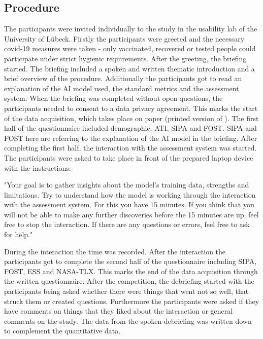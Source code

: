 \documentclass[11pt,a4paper,english]{scrreprt}
\begin{document}
\subsection{Procedure}\label{subsection:procedure}
The participants were invited individually to the study in the usability lab of the University of Lübeck. Firstly the participants were greeted and the necessary covid-19 measures were taken - only vaccinated, recovered or tested people could participate under strict hygienic requirements. After the greeting, the briefing started. The briefing included a spoken and written thematic introduction and a brief overview of the procedure. Additionally the participants got to read an explanation of the AI model used, the standard metrics and the assessment system. When the briefing was completed without open questions, the participants needed to consent to a data privacy agreement. This marks the start of the data acquisition, which takes place on paper (printed version of ). The first half of the questionnaire included demographic, ATI, SIPA and FOST. SIPA and FOST here are referring to the explanation of the AI model in the briefing. After completing the first half, the interaction with the assessment system was started. The participants were asked to take place in front of the prepared laptop device with the instructions:

\begin{displayquote}
    "Your goal is to gather insights about the model's training data, strengths and limitations. Try to understand how the model is working through the interaction with the assessment system. For this you have 15 minutes. If you think that you will not be able to make any further discoveries before the 15 minutes are up, feel free to stop the interaction. If there are any questions or errors, feel free to ask for help."
\end{displayquote}

During the interaction the time was recorded. After the interaction the participants got to complete the second half of the questionnaire including SIPA, FOST, ESS and NASA-TLX. This marks the end of the data acquisition through the written questionnaire. After the competition, the debriefing started with the participants being asked whether there were things that went not so well, that struck them or created questions. Furthermore the participants were asked if they have comments on things that they liked about the interaction or general comments on the study. The data from the spoken debriefing was written down to complement the quantitative data.
\end{document}
